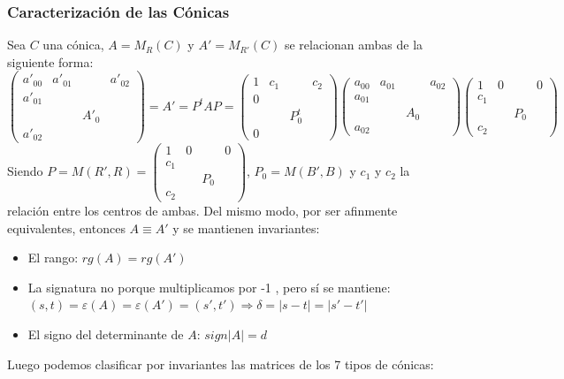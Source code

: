 \documentclass[10pt,a4paper,openright]{book}
\begin{document}
\subsubsection*{Caracterización de las Cónicas}
Sea $C$ una cónica, $A = M_R (C) $ y $A' = M_{R'} (C)$ se relacionan ambas de la siguiente forma:
$$\left(\begin{array}{c|ccc}
a'_{00} & a'_{01}& & a'_{02} \\
\hline
a'_{01} & & &   \\
 & & A'_0 & \\
a'_{02} &  & & 
\end{array}
\right)= A' = P^t A P = \left(\begin{array}{c|ccc}
1 & c_1 & & c_2 \\
\hline
0 & & &   \\
 & & P^t_0 & \\
0 &  & & 
\end{array}
\right)\left(\begin{array}{c|ccc}
a_{00} & a_{01}& & a_{02} \\
\hline
a_{01} & & &   \\
 & & A_0 & \\
a_{02} &  & & 
\end{array}
\right) \left(\begin{array}{c|ccc}
1 & 0 && 0 \\
\hline
c_1 & &&   \\
 & & P_0 & \\
c_2 & &&
\end{array}
\right)$$
Siendo $P = M(R', R) = \left(\begin{array}{c|ccc}
1 & 0 && 0 \\
\hline
c_1 & &&   \\
 & & P_0 & \\
c_2 & &&
\end{array}
\right)$, $P_0 = M (B', B) $ y $c_1$ y $c_2$ la relación entre los centros de ambas. Del mismo modo, por ser afinmente equivalentes, entonces $A \equiv A'$ y se mantienen invariantes:
\begin{itemize}
\item El rango: $rg(A) = rg(A')$
\item La signatura no porque multiplicamos por -1 , pero sí se mantiene: $(s,t) = \varepsilon(A) = \varepsilon(A') = (s', t') \Rightarrow \delta = |s - t| = |s' - t'|$
\item El signo del determinante de $A$: $sign|A| = d$
\end{itemize}
Luego podemos clasificar por invariantes las matrices de los 7 tipos de cónicas:
\end{document}
